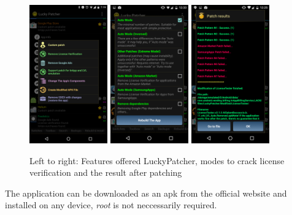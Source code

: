 \begin{figure}[h]
    \centering
    \includegraphics[width=0.3\textwidth]{data/luckyFeatures.png}
    \includegraphics[width=0.3\textwidth]{data/luckyModi.png}
    \includegraphics[width=0.3\textwidth]{data/luckyPatching.png}
    \caption{Left to right: Features offered LuckyPatcher, modes to crack license verification and the result after patching}
    \label{fig:luckyScreen}
\end{figure}
The application can be downloaded as an \gls{apk} from the official website \cite{luckyPatcherOfficial} and installed on any device, \textit{root} is not neccessarily required.
